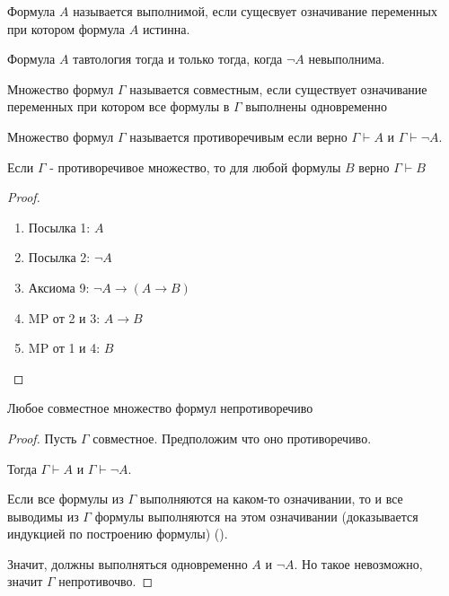 \begin{definition} \thmslashn 

    Формула $A$ называется выполнимой, если сущесвует означивание переменных при котором формула $A$  истинна.
\end{definition}
\begin{consequence} \thmslashn

    Формула $A$ тавтология тогда и только тогда, когда $\neg A$ невыполнима. 
\end{consequence}
\begin{definition} \thmslashn 

    Множество формул $\Gamma$ называется совместным, если существует означивание переменных при котором все формулы в $\Gamma$ выполнены одновременно
\end{definition}
\begin{definition} \thmslashn 

    Множество формул $\Gamma$ называется противоречивым если верно $\Gamma \vdash A$ и $\Gamma \vdash \neg A$.
\end{definition}
\begin{consequence} \thmslashn

    Если $\Gamma$ - противоречивое множество, то для любой формулы $B$ верно $\Gamma \vdash B$
    \begin{proof} \thmslashn
    
        \begin{enumerate}
            \item Посылка 1: $A$
            \item Посылка 2: $\neg A$
            \item Аксиома 9: $\neg A \to (A \to B)$
            \item MP от 2 и 3: $A \to B$
            \item MP от 1 и 4: $B$ \qedhere
        \end{enumerate}
    \end{proof}
\end{consequence}
\begin{theorem} \thmslashn

    Любое совместное множество формул непротиворечиво

    \begin{proof} \thmslashn
    
        Пусть $\Gamma$ совместное. Предположим что оно противоречиво.

        Тогда $\Gamma \vdash A$ и $\Gamma \vdash \neg A$.

        Если все формулы из $\Gamma$ выполняются на каком-то означивании, то и все выводимы из $\Gamma$ формулы выполняются на этом означивании (доказывается индукцией по построению формулы) ().

        Значит, должны выполняться одновременно $A$ и $\neg A$. Но такое невозможно, значит $\Gamma$ непротивочво.
    \end{proof}
\end{theorem}
